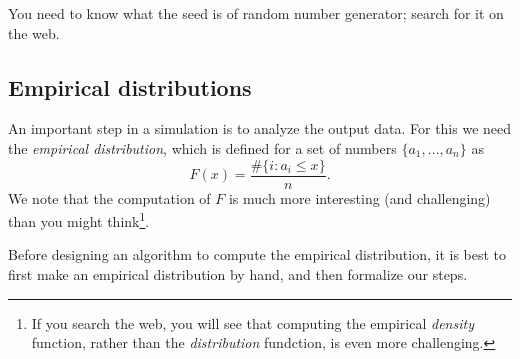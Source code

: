 You need to know what the seed is of random number generator; search for it on the web.

\subsection{Empirical distributions}
\label{sec:empir-distr}

An important step in a simulation is to analyze the output data.
For this we need the \emph{empirical distribution}, which is defined for a set of numbers $\{a_1,\ldots, a_n\}$ as
  \begin{equation}
    \label{eq:1}
    F(x) = \frac{\# \{i : a_i \leq x\}}{n}.
  \end{equation}
We note that  the computation of $F$ is much more interesting (and challenging) than you might think\footnote{If you search the web, you will see that computing the empirical \emph{density} function, rather than the \emph{distribution} fundction, is even more challenging.}.

Before designing an algorithm to compute the empirical distribution, it is best to first make an empirical distribution by hand, and then formalize our steps.

